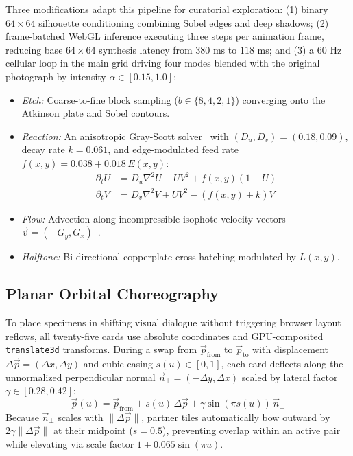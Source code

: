 \documentclass[journal,compsoc]{IEEEtran}
\begin{document}
Three modifications adapt this pipeline for curatorial exploration: (1) binary $64\times 64$ silhouette conditioning combining Sobel edges and deep shadows; (2) frame-batched WebGL inference executing three steps per animation frame, reducing base $64\times 64$ synthesis latency from $380\text{ ms}$ to $118\text{ ms}$; and (3) a $60\text{ Hz}$ cellular loop in the main grid driving four modes blended with the original photograph by intensity $\alpha \in [0.15, 1.0]$:
\begin{itemize}
  \item \emph{Etch:} Coarse-to-fine block sampling ($b \in \{8, 4, 2, 1\}$) converging onto the Atkinson plate and Sobel contours.
  \item \emph{Reaction:} An anisotropic Gray-Scott solver~\cite{pearson1993} with $(D_u, D_v) = (0.18, 0.09)$, decay rate $k = 0.061$, and edge-modulated feed rate $f(x,y) = 0.038 + 0.018\,E(x,y)$:
  \begin{align}
  \partial_t U &= D_u \nabla^2 U - UV^2 + f(x,y)(1-U) \\
  \partial_t V &= D_v \nabla^2 V + UV^2 - (f(x,y) + k)V
  \end{align}
  \item \emph{Flow:} Advection along incompressible isophote velocity vectors $\vec{v} = (-G_y, G_x)$~\cite{bridson2007}.
  \item \emph{Halftone:} Bi-directional copperplate cross-hatching modulated by $L(x,y)$.
\end{itemize}

\subsection{Planar Orbital Choreography}
To place specimens in shifting visual dialogue without triggering browser layout reflows, all twenty-five cards use absolute coordinates and GPU-composited \texttt{translate3d} transforms. During a swap from $\vec{p}_{\text{from}}$ to $\vec{p}_{\text{to}}$ with displacement $\Delta\vec{p} = (\Delta x, \Delta y)$ and cubic easing $s(u) \in [0, 1]$, each card deflects along the unnormalized perpendicular normal $\vec{n}_\perp = (-\Delta y, \Delta x)$ scaled by lateral factor $\gamma \in [0.28, 0.42]$:
\begin{equation}
\vec{p}(u) = \vec{p}_{\text{from}} + s(u)\,\Delta\vec{p} + \gamma \sin(\pi s(u))\,\vec{n}_\perp
\end{equation}
Because $\vec{n}_\perp$ scales with $\|\Delta\vec{p}\|$, partner tiles automatically bow outward by $2\gamma\|\Delta\vec{p}\|$ at their midpoint ($s = 0.5$), preventing overlap within an active pair while elevating via scale factor $1 + 0.065\sin(\pi u)$.
\end{document}
